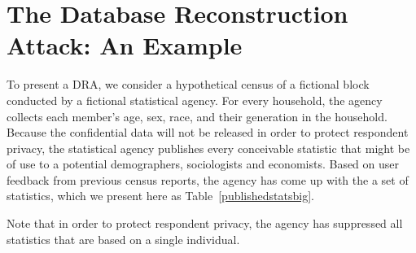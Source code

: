 \documentclass[runningheads]{llncs}
\begin{document}
\section{The Database Reconstruction Attack: An Example}

To present a DRA, we consider a hypothetical
census of a fictional block conducted by a fictional statistical
agency. For every household, the agency collects each member's age,
sex, race, and their generation in the household.  Because the
confidential data will not be released in order to protect respondent privacy, the statistical agency
publishes every conceivable statistic that might be of use to a
potential demographers, sociologists and economists. Based on user
feedback from previous census reports, the agency has come up with the
a set of statistics, which we present here as Table~\ref{publishedstatsbig}.

Note that in order to protect respondent privacy, the agency has
suppressed all statistics that are based on a single
individual.
\end{document}

